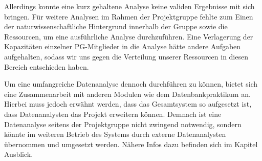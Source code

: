 Allerdings konnte eine kurz gehaltene Analyse keine validen Ergebnisse mit sich bringen. 
Für weitere Analysen im Rahmen der Projektgruppe fehlte zum Einen der naturwissenschaftliche Hintergrund innerhalb der Gruppe sowie die Ressourcen, um eine ausführliche Analyse durchzuführen.
Eine Verlagerung der Kapazitäten einzelner PG-Mitglieder in die Analyse hätte andere Aufgaben aufgehalten, sodass wir uns gegen die Verteilung unserer Ressourcen in diesen Bereich entschieden haben.

Um eine umfangreiche Datenanalyse dennoch durchführen zu können, bietet sich eine Zusammenarbeit mit anderen Modulen wie dem Datenbankpraktikum an.
Hierbei muss jedoch erwähnt werden, dass das Gesamtsystem so aufgesetzt ist, dass Datenanalysten das Projekt erweitern können.
Demnach ist eine Datenanalyse seitens der Projektgruppe nicht zwingend notwendig, sondern könnte im weiteren Betrieb des Systems durch externe Datenanalysten übernommen und umgesetzt werden.
Nähere Infos dazu befinden sich im Kapitel Ausblick.
